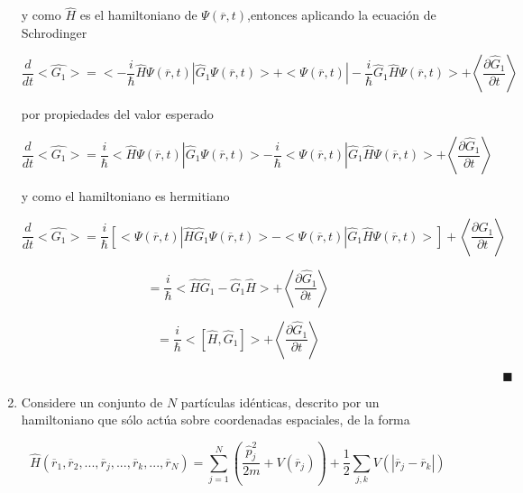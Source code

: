 \documentclass[12pt,a4paper]{article}
\begin{document}
\begin{enumerate}
y como $\hat{H}$ es el hamiltoniano de $\Psi(\overline{r},t)$,entonces aplicando la ecuación de Schrodinger

\begin{equation*}
    \frac{d}{dt} <\hat{G_1}> = <-\frac{i}{\hbar} \hat{H} \Psi(\overline{r},t) |\hat{G}_1 \Psi(\overline{r},t) > + <\Psi(\overline{r},t)|-\frac{i}{\hbar}\hat{G}_1 \hat{H} \Psi(\overline{r},t)> +  \left<\frac{\partial \hat{G}_1}{\partial t}\right>
\end{equation*}

por propiedades del valor esperado

\begin{equation*}
    \frac{d}{dt} <\hat{G_1}> = \frac{i}{\hbar}< \hat{H} \Psi(\overline{r},t) |\hat{G}_1 \Psi(\overline{r},t) >  -\frac{i}{\hbar}<\Psi(\overline{r},t)|\hat{G}_1 \hat{H}\Psi(\overline{r},t)> +  \left<\frac{\partial \hat{G}_1}{\partial t}\right>
\end{equation*}

y como el hamiltoniano es hermitiano

\begin{equation*}
    \frac{d}{dt} <\hat{G_1}> =\frac{i}{\hbar}\left[<\Psi(\overline{r},t) |\hat{H}\hat{G}_1 \Psi(\overline{r},t) >  -<\Psi(\overline{r},t)|\hat{G}_1 \hat{H}\Psi(\overline{r},t)>\right] +  \left<\frac{\partial \hat{G}_1}{\partial t}\right>
\end{equation*}

\begin{equation*}
    =\frac{i}{\hbar} <\hat{H}\hat{G}_1 - \hat{G}_1 \hat{H}> +  \left<\frac{\partial \hat{G}_1}{\partial t}\right>
\end{equation*}

\begin{equation*}
    =\frac{i}{\hbar} <[\hat{H},\hat{G}_1]> +  \left<\frac{\partial \hat{G}_1}{\partial t}\right>
\end{equation*}

$\hspace{16cm} \blacksquare$






\item Considere un conjunto de $N$ partículas idénticas, descrito por un hamiltoniano que sólo actúa sobre coordenadas espaciales, de la forma

\begin{equation*}
    \hat{H}(\overline{r}_{1},\overline{r}_{2}, ...,\overline{r}_{j},...,\overline{r}_{k}, ..., \overline{r}_{N}) = \sum_{j =1}^{N} \left(\frac{\hat{p}_{j}^{2}}{2m} + V(\overline{r}_{j})\right) + \frac{1}{2}\sum_{j,k} V(|\overline{r}_{j}-\overline{r}_{k}|)
\end{equation*}


\end{enumerate}
\end{document}

